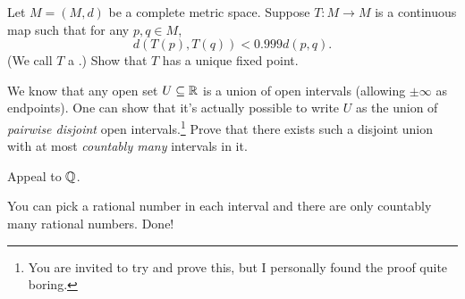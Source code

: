
\begin{dproblem}
	Let $M = (M,d)$ be a complete metric space.
	Suppose $T : M \to M$ is a continuous map such that for any $p,q \in M$,
	\[ d\left( T(p), T(q) \right) < 0.999 d(p,q). \]
	(We call $T$ a .)
	Show that $T$ has a unique fixed point.
\end{dproblem}

\begin{problem}
	\gim
	We know that any open set $U \subseteq \mathbb R$
	is a union of open intervals (allowing $\pm\infty$ as endpoints).
	One can show that it's actually possible to write $U$ as the
	union of \emph{pairwise disjoint} open intervals.\footnote{You are invited to try
	and prove this, but I personally found the proof quite boring.}
	Prove that there exists such a disjoint union with at most \emph{countably many}
	intervals in it.
	\begin{hint}
		Appeal to $\mathbb Q$.
	\end{hint}
	\begin{sol}
		You can pick a rational number in each interval and
		there are only countably many rational numbers. Done!
	\end{sol}
\end{problem}


